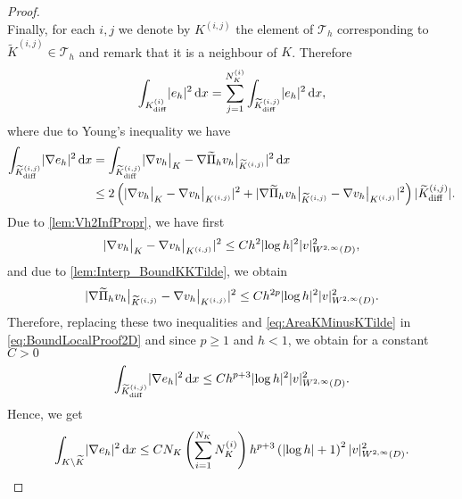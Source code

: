 \documentclass[10pt]{article}
\begin{document}
\begin{proof}
\begin{equation}
	\end{equation}
	Finally, for each $i,j$ we denote by $K^{(i,j)}$ the element of $\mathcal T_h$ corresponding to $\widetilde K^{(i,j)} \in \mathcal T_h$ and remark that it is a neighbour of $K$. Therefore
	\begin{equation}
		\int_{K_{\mathrm{diff}}^{(i)}}\lvert e_h\rvert^2 \, \mathrm{d} x = \sum_{j=1}^{N_K^{(i)}} \int_{\widetilde K_{\mathrm{diff}}^{(i,j)}}\lvert e_h\rvert^2 \, \mathrm{d} x,
	\end{equation}
	where due to Young's inequality we have 
	\begin{equation}\label{eq:BoundLocalProof2D}
	\begin{aligned}
		\int_{\widetilde K_{\mathrm{diff}}^{(i,j)}}\lvert\nabla  e_h\rvert^2 \, \mathrm{d} x &= \int_{\widetilde K_{\mathrm{diff}}^{(i,j)}} \lvert\nabla v_h\bigr\rvert_{K} - \nabla \widetilde \Pi_h v_h\bigr\rvert_{\widetilde K^{(i,j)}}\rvert^2 \, \mathrm{d} x \\
		&\leq 2\left(\lvert\nabla v_h\bigr\rvert_{K} - \nabla v_h\bigr\rvert_{K^{(i,j)}}\rvert^2 + \lvert\nabla \widetilde \Pi_h v_h\bigr\rvert_{\widetilde K^{(i,j)}} - \nabla v_h\bigr\rvert_{K^{(i,j)}}\rvert^2\right) \lvert\widetilde K_{\mathrm{diff}}^{(i,j)}\rvert.
	\end{aligned}
	\end{equation}
	Due to \cref{lem:Vh2InfPropr}, we have first
	\begin{equation}
		\lvert\nabla v_h\bigr\rvert_{K} - \nabla v_h\bigr\rvert_{K^{(i,j)}}\rvert^2 \leq C h^2 \lvert\log h\rvert^2 \lvert v\rvert_{W^{2, \infty}(D)}^2,
	\end{equation}
	and due to \cref{lem:Interp_BoundKKTilde}, we obtain
	\begin{equation}
		\lvert\nabla \widetilde \Pi_h v_h\bigr\rvert_{\widetilde K^{(i,j)}} - \nabla v_h\bigr\rvert_{K^{(i,j)}}\rvert^2 \leq C h^{2p} \lvert\log h\rvert^2 \lvert v\rvert_{W^{2, \infty}(D)}^2.
	\end{equation}
	Therefore, replacing these two inequalities and \eqref{eq:AreaKMinusKTilde} in \eqref{eq:BoundLocalProof2D} and since $p\geq 1$ and $h < 1$, we obtain for a constant $C > 0$
	\begin{equation}
		\int_{\widetilde K_{\mathrm{diff}}^{(i,j)}}\lvert\nabla  e_h\rvert^2 \, \mathrm{d} x \leq C h^{p+3} \lvert\log h\rvert^2 \lvert v\rvert_{W^{2, \infty}(D)}^2.
	\end{equation}
	Hence, we get
	\begin{equation}\label{eq:IntegralKMinusKTilde}
		\int_{K \setminus \widetilde K} \lvert\nabla  e_h\rvert^2 \, \mathrm{d} x\leq C N_K \left(\sum_{i=1}^{N_K} N_K^{(i)} \right)h^{p+3} \left(\lvert\log h\rvert + 1\right)^2 \lvert v\rvert_{W^{2, \infty}(D)}^2.
	\end{equation}

\end{proof}
\end{document}
